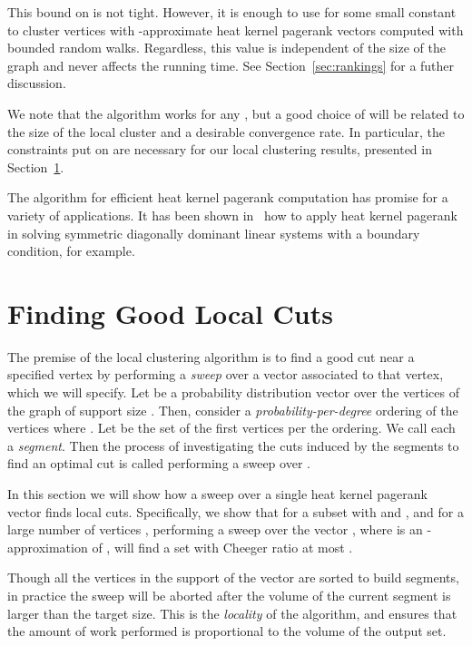 \documentclass[runningheads,a4paper]{llncs}
\begin{document}
\begin{remark}
This bound on  is not tight.  However, it is enough to use  for some
small constant  to cluster vertices with -approximate heat kernel
pagerank vectors computed with bounded random walks.  Regardless, this value
 is independent of the size of the graph and never affects the running
time.  See Section~\ref{sec:rankings} for a futher discussion.
\end{remark}

\begin{remark}
We note that the algorithm works for any , but a good choice of  will be
related to the size of the local cluster  and a desirable convergence rate.
In particular, the constraints put on  are necessary for our local clustering
results, presented in Section~\ref{sec:goodcuts}.
\end{remark}

The algorithm for efficient heat kernel pagerank computation has promise for a
variety of applications.  It has been shown in~\cite{cs:hklinear:13} how to
apply heat kernel pagerank in solving symmetric diagonally dominant linear
systems with a boundary condition, for example.


\section{Finding Good Local Cuts}
\label{sec:goodcuts}
The premise of the local clustering algorithm is to find a good cut near a
specified vertex by performing a \emph{sweep} over a vector associated to that
vertex, which we will specify.  Let  be a probability
distribution vector over the vertices of the graph of support size .  Then, consider a \emph{probability-per-degree} ordering of the
vertices where .  Let  be the set of the first  vertices per the
ordering.  We call each  a \emph{segment}.  Then the process of
investigating the cuts induced by the segments to find an optimal cut is called
performing a sweep over .  

In this section we will show how a sweep over a single heat kernel pagerank
vector finds local cuts.  Specifically, we show that for a subset  with
 and , and for a large number of
vertices , performing a sweep over the vector , where
 is an -approximation of , will find a set with
Cheeger ratio at most .

\begin{remark}
Though all the vertices in the support of the vector are sorted to build
segments, in practice the sweep will be aborted after the volume of the current
segment is larger than the target size.  This is the \emph{locality} of the
algorithm, and ensures that the amount of work performed is proportional to the
volume of the output set.
\end{remark}
\end{document}
